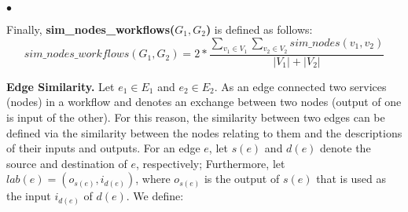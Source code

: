 \documentclass{new_tlp}
\begin{document}
{\begin{list}{$\bullet$}{\itemsep=0pt \parsep=1pt \topsep=1pt \leftmargin=10pt}

%
Finally, \textbf{sim\_nodes\_workflows($G_1,G_2$)} is defined as follows:
		   \begin{equation} \label{simnode}
		   sim\_nodes\_workflows(G_1,G_2) = 2 * \frac{\sum_{v_1 \in V_1} \sum_{v_2 \in V_2} sim\_nodes(v_{1}, v_{2})}{|V_1| + |V_2|}\end{equation}
	

\item {\bf Edge Similarity.} Let $e_1 \in E_1$ and $e_2 \in E_2$. 
As an edge connected two services (nodes) in a workflow and denotes an exchange between two nodes (output of one is input of the other). 
For this reason, the similarity between two edges can be defined via the similarity between the nodes relating to them and the descriptions of their 
inputs and outputs. For an edge $e$, let $s(e)$ and $d(e)$ denote the source and destination of $e$, respectively; 
Furthermore, let $lab(e) = (o_{s(e)},i_{d(e)})$, where $o_{s(e)}$ is the
output of $s(e)$ that is used as the input $i_{d(e)}$ of $d(e)$. We define:
%
%
%
%
% 





\end{list}}
\end{document}
